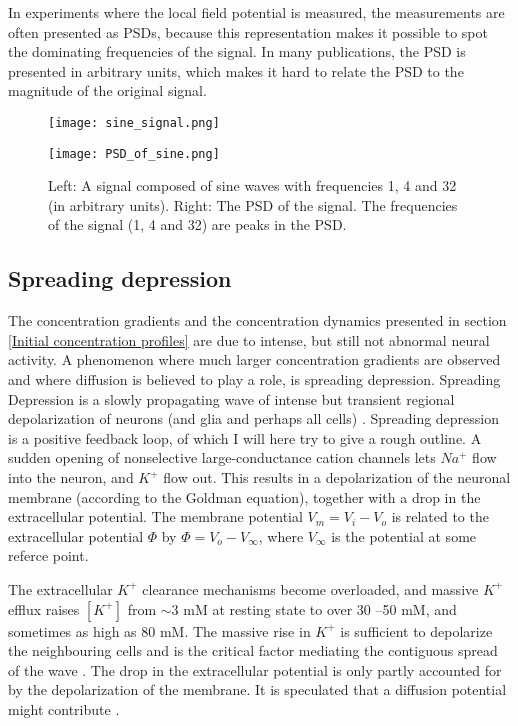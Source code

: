 \documentclass{article}
\begin{document}
In experiments where the local field potential is measured, the measurements are often presented as PSDs, because this representation makes it possible to spot the dominating frequencies of the signal. In many publications, the PSD is presented in arbitrary units, which makes it hard to relate the PSD to the magnitude of the original signal.

\begin{figure}[!tbp]
  \centering
  \begin{minipage}[b]{0.45\textwidth}
    \texttt{[image: sine\_signal.png]}
  \end{minipage}
  \begin{minipage}[b]{0.45\textwidth}
    \texttt{[image: PSD\_of\_sine.png]}
  \end{minipage}  
   \caption{Left: A signal composed of sine waves with frequencies 1, 4 and 32 (in arbitrary units).  Right: The PSD of the signal. The frequencies of the signal (1, 4 and 32) are peaks in the PSD. }
  \label{fig:PSD_of_sine}
\end{figure}

\subsection{Spreading depression}\label{SD}
The concentration gradients and the concentration dynamics presented in section \ref{Initial concentration profiles} are due to intense, but still not abnormal neural activity. A phenomenon where much larger concentration gradients are observed and where diffusion is believed to play a role, is spreading depression. Spreading Depression is a slowly propagating wave of intense but transient
regional depolarization of neurons (and glia and perhaps all cells) \cite{Ataya2015}. Spreading depression is a positive feedback loop, of which I will here try to give a rough outline. A sudden opening of nonselective large-conductance cation channels lets $Na^+$ flow into the neuron, and $K^+$ flow out. This results in a depolarization of the neuronal membrane (according to the Goldman equation), together with a drop in the extracellular potential. The membrane potential $V_m=V_i-V_o$ is related to the extracellular potential $\Phi$ by $\Phi = V_o - V_{\infty}$, where $V_{\infty}$ is the potential at some referce point. 

The extracellular $K^+$ clearance mechanisms become overloaded, and massive $K^+$ efflux raises $[K^+]$ from $ \sim 3$ mM at resting state
to over 30 –50 mM, and sometimes as
high as 80 mM. The massive rise in $K^+$ is sufficient to depolarize the neighbouring cells and is the critical factor mediating the contiguous spread of
the wave \cite{Ataya2015}. The drop in the extracellular potential is only partly accounted for by the depolarization of the membrane. It is speculated that a diffusion potential might contribute \cite{Herreras1993}. 
\end{document}
